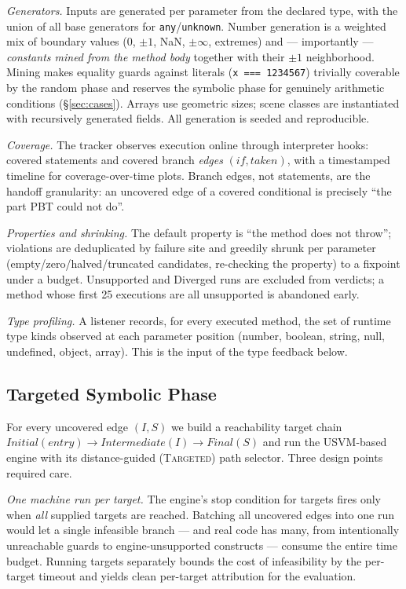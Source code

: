 \documentclass[sigconf,nonacm,screen]{acmart}
\begin{document}
\emph{Generators.} Inputs are generated per parameter from the declared
type, with the union of all base generators for
\lstinline|any|/\lstinline|unknown|. Number generation is a weighted mix of
boundary values ($0$, $\pm 1$, NaN, $\pm\infty$, extremes) and ---
importantly --- \emph{constants mined from the method body} together with
their $\pm 1$ neighborhood. Mining makes equality guards against literals
(\lstinline|x === 1234567|) trivially coverable by the random phase and
reserves the symbolic phase for genuinely arithmetic conditions
(\S\ref{sec:cases}). Arrays use geometric sizes; scene classes are
instantiated with recursively generated fields. All generation is seeded
and reproducible.

\emph{Coverage.} The tracker observes execution online through interpreter
hooks: covered statements and covered branch \emph{edges}
$(\mathit{if}, \mathit{taken})$, with a timestamped timeline for
coverage-over-time plots. Branch edges, not statements, are the handoff
granularity: an uncovered edge of a covered conditional is precisely ``the
part PBT could not do''.

\emph{Properties and shrinking.} The default property is ``the method does
not throw''; violations are deduplicated by failure site and greedily
shrunk per parameter (empty/zero/halved/truncated candidates, re-checking
the property) to a fixpoint under a budget. \textsf{Unsupported} and
\textsf{Diverged} runs are excluded from verdicts; a method whose first 25
executions are all unsupported is abandoned early.

\emph{Type profiling.} A listener records, for every executed method, the
set of runtime type kinds observed at each parameter position
(number, boolean, string, null, undefined, object, array). This is the
input of the type feedback below.

\subsection{Targeted Symbolic Phase}
\label{sec:symbolic}

For every uncovered edge $(I, S)$ we build a reachability target chain
$\mathit{Initial}(\mathit{entry}) \to \mathit{Intermediate}(I) \to
\mathit{Final}(S)$ and run the USVM-based engine with its distance-guided
(\textsc{Targeted}) path selector. Three design points required care.

\emph{One machine run per target.} The engine's stop condition for targets
fires only when \emph{all} supplied targets are reached. Batching all
uncovered edges into one run would let a single infeasible branch --- and
real code has many, from intentionally unreachable guards to
engine-unsupported constructs --- consume the entire time budget. Running
targets separately bounds the cost of infeasibility by the per-target
timeout and yields clean per-target attribution for the evaluation.
\end{document}
